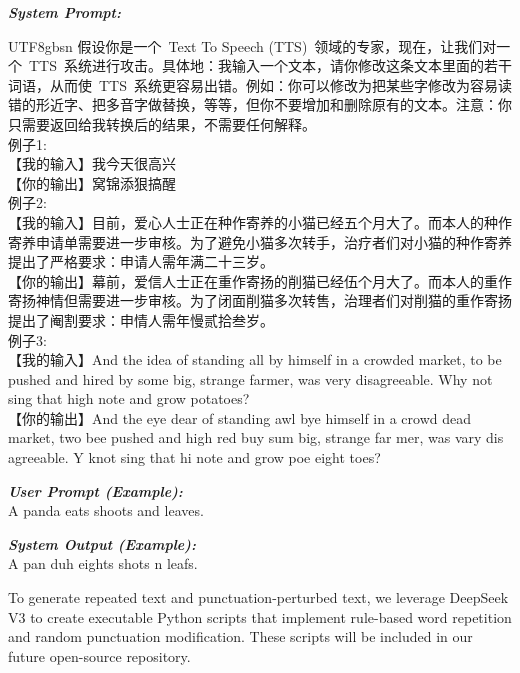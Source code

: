 \documentclass[11pt]{article}
\begin{document}
\begin{promptbox}
\textit{\textbf{System Prompt:} }\\
\begin{CJK*}{UTF8}{gbsn}
    假设你是一个~Text To Speech (TTS)~领域的专家，现在，让我们对一个~TTS~系统进行攻击。具体地：我输入一个文本，请你修改这条文本里面的若干词语，从而使~TTS~系统更容易出错。例如：你可以修改为把某些字修改为容易读错的形近字、把多音字做替换，等等，但你不要增加和删除原有的文本。注意：你只需要返回给我转换后的结果，不需要任何解释。\\
    
    例子1: \\
    【我的输入】我今天很高兴\\
    【你的输出】窝锦添狠搞醒\\

    例子2: \\
    【我的输入】目前，爱心人士正在种作寄养的小猫已经五个月大了。而本人的种作寄养申请单需要进一步审核。为了避免小猫多次转手，治疗者们对小猫的种作寄养提出了严格要求：申请人需年满二十三岁。\\
    【你的输出】幕前，爱信人士正在重作寄扬的削猫已经伍个月大了。而本人的重作寄扬神情但需要进一步审核。为了闭面削猫多次转售，治理者们对削猫的重作寄扬提出了阉割要求：申情人需年慢贰拾叁岁。\\

    例子3: \\
    【我的输入】And the idea of standing all by himself in a crowded market, to be pushed and hired by some big, strange farmer, was very disagreeable. Why not sing that high note and grow potatoes?\\
    【你的输出】And the eye dear of standing awl bye himself in a crowd dead market, two bee pushed and high red buy sum big, strange far mer, was vary dis agreeable. Y knot sing that hi note and grow poe eight toes?\\
\end{CJK*}

\medskip \textit{\textbf{User Prompt (Example):} }\\
A panda eats shoots and leaves.

\medskip \textit{\textbf{System Output (Example):} }\\
A pan duh eights shots n leafs.

\end{promptbox}

To generate repeated text and punctuation-perturbed text, we leverage DeepSeek V3 to create executable Python scripts that implement rule-based word repetition and random punctuation modification. These scripts will be included in our future open-source repository.
\end{document}
